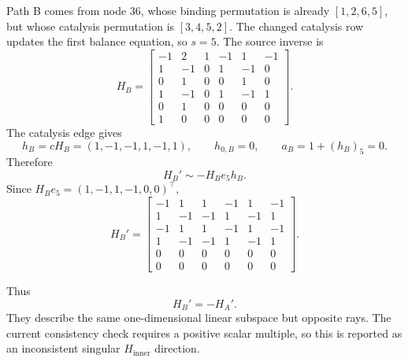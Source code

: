 \documentclass[11pt]{article}
\begin{document}
Path B comes from node \(36\), whose binding permutation is already
\([1,2,6,5]\), but whose catalysis permutation is \([3,4,5,2]\).  The changed
catalysis row updates the first balance equation, so \(s=5\).  The source
inverse is
\[
H_B=
\begin{bmatrix}
-1&2&1&-1&1&-1\\
 1&-1&0&1&-1&0\\
 0&1&0&0&1&0\\
 1&-1&0&1&-1&1\\
 0&1&0&0&0&0\\
 1&0&0&0&0&0
\end{bmatrix}.
\]
The catalysis edge gives
\[
    h_B=cH_B=(1,-1,-1,1,-1,1),
    \qquad
    h_{0,B}=0,
    \qquad
    a_B=1+(h_B)_5=0.
\]
Therefore
\[
    H_B'\sim -H_Be_5h_B.
\]
Since \(H_Be_5=(1,-1,1,-1,0,0)^\top\),
\[
H_B'=
\begin{bmatrix}
-1&1&1&-1&1&-1\\
 1&-1&-1&1&-1&1\\
-1&1&1&-1&1&-1\\
 1&-1&-1&1&-1&1\\
 0&0&0&0&0&0\\
 0&0&0&0&0&0
\end{bmatrix}.
\]

Thus
\[
    H_B'=-H_A'.
\]
They describe the same one-dimensional linear subspace but opposite rays.  The
current consistency check requires a positive scalar multiple, so this is
reported as an inconsistent singular \(H_{\mathrm{inner}}\) direction.
\end{document}
